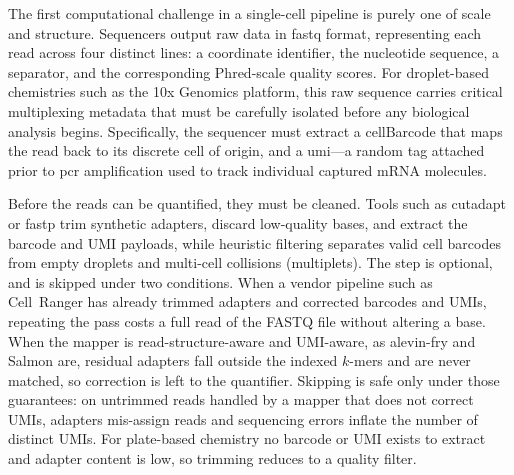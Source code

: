 The first computational challenge in a single-cell pipeline is purely one of scale and structure. Sequencers output raw data in \gls{fastq} format, representing each read across four distinct lines: a coordinate identifier, the nucleotide sequence, a separator, and the corresponding Phred-scale quality scores. For droplet-based chemistries such as the 10x Genomics platform, this raw sequence carries critical multiplexing metadata that must be carefully isolated before any biological analysis begins. Specifically, the sequencer must extract a \gls{cellBarcode} that maps the read back to its discrete cell of origin, and a \gls{umi}---a random tag attached prior to \gls{pcr} amplification used to track individual captured mRNA molecules.

Before the reads can be quantified, they must be cleaned. Tools such as cutadapt or fastp trim synthetic adapters, discard low-quality bases, and extract the barcode and UMI payloads, while heuristic filtering separates valid cell barcodes from empty droplets and multi-cell collisions (multiplets). The step is optional, and is skipped under two conditions. When a vendor pipeline such as Cell~Ranger has already trimmed adapters and corrected barcodes and UMIs, repeating the pass costs a full read of the FASTQ file without altering a base. When the mapper is read-structure-aware and UMI-aware, as alevin-fry and Salmon are, residual adapters fall outside the indexed $k$-mers and are never matched, so correction is left to the quantifier. Skipping is safe only under those guarantees: on untrimmed reads handled by a mapper that does not correct UMIs, adapters mis-assign reads and sequencing errors inflate the number of distinct UMIs. For plate-based chemistry no barcode or UMI exists to extract and adapter content is low, so trimming reduces to a quality filter.

